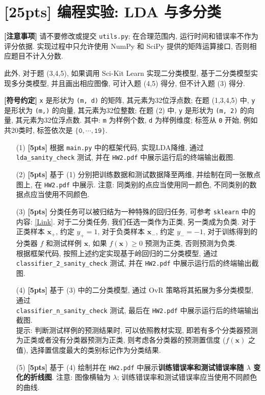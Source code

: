 \documentclass[a4paper]{article}
\numberwithin{equation}{section}
\theoremstyle{definition}
\def \x {\bm{x}}
\begin{document}
\newpage

\section{[25pts] 编程实验: LDA 与多分类}

\begin{tcolorbox}
	\textbf{[注意事项]} 请不要修改或提交 \texttt{utils.py}; 在合理范围内, 运行时间和错误率不作为评分依据. 实现过程中只允许使用 NumPy 和 SciPy 提供的矩阵运算接口, 否则相应题目不计入分数.

	此外, 对于题 (3,4,5), 如果调用 Sci-Kit Learn 实现二分类模型, 基于二分类模型实现多分类模型, 并且画出相应图像, 可计入题 (4,5) 得分, 但不计入题 (3) 得分.

	\textbf{[符号约定]} \texttt{x} 是形状为 \texttt{(m, d)} 的矩阵, 其元素为32位浮点数; 在题 (1,3,4,5) 中, \texttt{y} 是形状为 \texttt{(m,)} 的向量, 其元素为32位整数; 在题 (2) 中, \texttt{y} 是形状为 \texttt{(m, 2)} 的向量, 其元素为32位浮点数. 其中: \texttt{m} 为样例个数, \texttt{d} 为样例维度; 标签从 \texttt{0} 开始, 例如共20类时, 标签依次是 $\{\mathtt{0}, \cdots, \mathtt{19}\}$.
\end{tcolorbox}

\begin{enumerate}
	\item[(1)] \textbf{[5pts]} 根据 \texttt{main.py} 中的框架代码, 实现LDA降维, 通过 \texttt{lda\_sanity\_check} 测试, 并在 \texttt{HW2.pdf} 中展示运行后的终端输出截图.
	\item[(2)] \textbf{[5pts]} 基于 (1) 分别把训练数据和测试数据降至两维, 并绘制在同一张散点图上, 在 \texttt{HW2.pdf} 中展示. 注意: 同类别的点应当使用同一颜色, 不同类别的数据点应当使用不同颜色.
	\item[(3)] \textbf{[5pts]} 分类任务可以被归结为一种特殊的回归任务, 可参考 \texttt{sklearn} 中的内容: \href{https://scikit-learn.org/stable/modules/linear_model.html#classification}{[Link]}. 对于二分类任务, 我们任选一类作为正类, 另一类成为负类. 对于正类样本 $\x_+$, 约定 $y_+ = 1$, 对于负类样本 $\x_-$, 约定 $y_- = -1$, 对于训练得到的分类器 $f$ 和测试样例 $\x$, 如果 $f(\x) \geqslant 0$ 预测为正类, 否则预测为负类. \\根据框架代码, 按照上述约定实现基于岭回归的二分类模型, 通过\\ \texttt{classifier\_2\_sanity\_check} 测试, 并在 \texttt{HW2.pdf} 中展示运行后的终端输出截图.
	\item[(4)] \textbf{[5pts]} 基于 (3) 中的二分类模型, 通过 OvR 策略将其拓展为多分类模型, 通过\\ \texttt{classifier\_n\_sanity\_check} 测试, 最后在 \texttt{HW2.pdf} 中展示运行后的终端输出截图.\\提示: 判断测试样例的预测结果时, 可以依照教材实现, 即若有多个分类器预测为正类或者没有分类器预测为正类, 则考虑各分类器的预测置信度 ($f(\x)$ 之值), 选择置信度最大的类别标记作为分类结果.
	\item[(5)] \textbf{[5pts]} 基于 (4) 绘制并在 \texttt{HW2.pdf} 中展示\textbf{训练错误率和测试错误率随 $\lambda$ 变化的折线图}. 注意: 图像横轴为 $\lambda$; 训练错误率和测试错误率应当使用不同颜色的曲线.
\end{enumerate}
\end{document}
